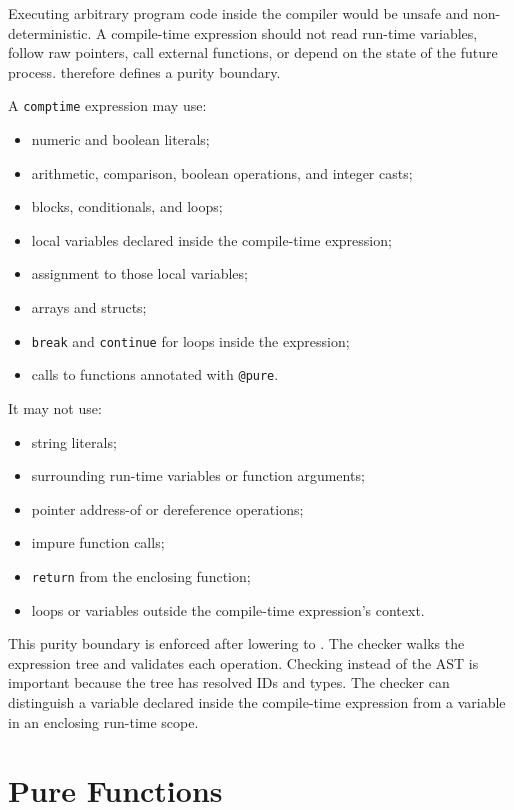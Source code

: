 Executing arbitrary program code inside the compiler would be unsafe and
non-deterministic. A compile-time expression should not read run-time variables,
follow raw pointers, call external functions, or depend on the state of the
future process. \epl{} therefore defines a purity boundary.

A \texttt{comptime} expression may use:

\begin{itemize}
  \item numeric and boolean literals;
  \item arithmetic, comparison, boolean operations, and integer casts;
  \item blocks, conditionals, and loops;
  \item local variables declared inside the compile-time expression;
  \item assignment to those local variables;
  \item arrays and structs;
  \item \texttt{break} and \texttt{continue} for loops inside the expression;
  \item calls to functions annotated with \texttt{@pure}.
\end{itemize}

It may not use:

\begin{itemize}
  \item string literals;
  \item surrounding run-time variables or function arguments;
  \item pointer address-of or dereference operations;
  \item impure function calls;
  \item \texttt{return} from the enclosing function;
  \item loops or variables outside the compile-time expression's context.
\end{itemize}

This purity boundary is enforced after lowering to \irtree{}. The checker walks
the expression tree and validates each operation. Checking \irtree{} instead of
the AST is important because the tree has resolved IDs and types. The checker
can distinguish a variable declared inside the compile-time expression from a
variable in an enclosing run-time scope.

\section{Pure Functions}

